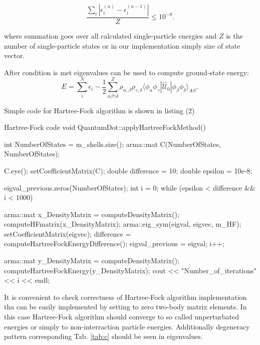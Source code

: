 \documentclass[10pt]{article}
\newcommand*{\hatU}{\hat{\mathcal{U}}}
\begin{document}
\begin{equation}
\frac{\sum_{i}|\epsilon_{i}^{(n)} - \epsilon_{i}^{(n-1)}|}{Z} \le 10^{-8}. \label{eq:diag-cond}
\end{equation}

where summation goes over all calculated single-particle energies and $Z$ is the number of single-particle states or in our implementation simply size of state vector.

After condition \label{eq:diag-cond} is met eigenvalues can be used to compute ground-state energy: 
\begin{equation} \label{final_energy}
E = \sum^N_i \epsilon_i - \frac{1}{2}\sum_{\alpha\beta\gamma\delta}^Z \rho_{\alpha,\beta} \rho_{\gamma,\delta}\langle \phi_{\alpha}\phi_{\gamma}|\hatU_{0}|\phi_{\beta}\phi_{\delta}\rangle_{AS},
\end{equation}







Simple code for Hartree-Fock algorithm is shown in listing (2)
\begin{pseudolisting}{Hartree-Fock code}
void QuantumDot::applyHartreeFockMethod(){
    int NumberOfStates = m_shells.size();
    arma::mat C(NumberOfStates, NumberOfStates);

    C.eye();
    setCoefficientMatrix(C);
    double difference = 10;
    double epsilon = 10e-8;

    eigval_previous.zeros(NumberOfStates);
    int i = 0;
    while (epsilon < difference && i < 1000){
        arma::mat x_DensityMatrix = computeDensityMatrix();
        computeHFmatrix(x_DensityMatrix);
        arma::eig_sym(eigval, eigvec, m_HF);
        setCoefficientMatrix(eigvec);
        difference = computeHartreeFockEnergyDifference();
        eigval_previous = eigval;
        i++;

    }

    arma::mat y_DensityMatrix = computeDensityMatrix();
    computeHartreeFockEnergy(y_DensityMatrix);
    cout << "Number_of_iterations" << i << endl;
}
\end{pseudolisting}

It is convenient to check correctness of Hartree-Fock algorithm implementation tha can be easily implemented by setting to zero two-body matrix elements. In this case Hartree-Fock algorithm should converge to so called unperturbated energies or simply to non-interraction particle energies. Additionally degeneracy pattern corresponding Tab. \ref{tab:c} should be seen in eigenvalues.
\end{document}

